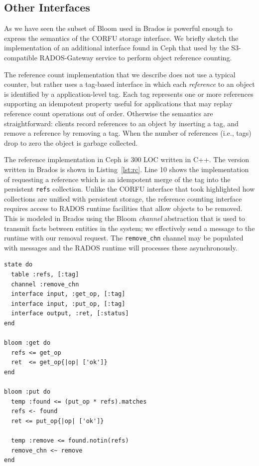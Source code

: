 \documentclass[10pt,twocolumn]{article}
\begin{document}
\subsection{Other Interfaces}

As we have seen the subset of Bloom used in Brados is powerful enough to
express the semantics of the CORFU storage interface. We briefly sketch the
implementation of an additional interface found in Ceph that used by the
S3-compatible RADOS-Gateway service to perform object reference counting.

The reference count implementation that we describe does not use a typical
counter, but rather uses a tag-based interface in which each \emph{reference}
to an object is identified by a application-level tag. Each tag represents one
or more references supporting an idempotent property useful for applications
that may replay reference count operations out of order. Otherwise the
semantics are straightforward: clients record references to an object by
inserting a tag, and remove a reference by removing a tag. When the number of
references (i.e., tags) drop to zero the object is garbage collected.

The reference implementation in Ceph is 300 LOC written in C++. The version
written in Brados is shown in Listing~\ref{lst:rc}. Line 10 shows the
implementation of requesting a reference which is an idempotent merge of the
tag into the persistent \texttt{refs} collection.  Unlike the CORFU interface
that took highlighted how collections are unified with persistent storage, the
reference counting interface requires access to RADOS runtime facilities that
allow objects to be removed. This is modeled in Brados using the Bloom
\emph{channel} abstraction that is used to transmit facts between entities in
the system; we effectively send a message to the runtime with our removal
request. The \texttt{remove\_chn} channel may be populated with messages and
the RADOS runtime will processes these asynchronously.

\begin{lstlisting}[caption={Reference counting interface}, label=lst:rc]
state do
  table :refs, [:tag]
  channel :remove_chn
  interface input, :get_op, [:tag]
  interface input, :put_op, [:tag]
  interface output, :ret, [:status]
end

bloom :get do
  refs <= get_op
  ret  <= get_op{|op| ['ok']}
end

bloom :put do
  temp :found <= (put_op * refs).matches
  refs <- found
  ret <= put_op{|op| ['ok']}

  temp :remove <= found.notin(refs)	
  remove_chn <~ remove
end
\end{lstlisting}
\end{document}
